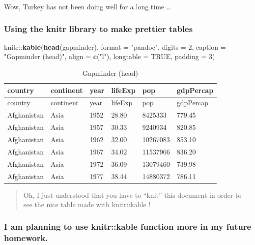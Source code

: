 \documentclass[]{article}
\newenvironment{Shaded}{\begin{snugshade}}{\end{snugshade}}
\newcommand{\KeywordTok}[1]{\textcolor[rgb]{0.13,0.29,0.53}{\textbf{{#1}}}}
\newcommand{\DataTypeTok}[1]{\textcolor[rgb]{0.13,0.29,0.53}{{#1}}}
\newcommand{\DecValTok}[1]{\textcolor[rgb]{0.00,0.00,0.81}{{#1}}}
\newcommand{\StringTok}[1]{\textcolor[rgb]{0.31,0.60,0.02}{{#1}}}
\newcommand{\OtherTok}[1]{\textcolor[rgb]{0.56,0.35,0.01}{{#1}}}
\newcommand{\NormalTok}[1]{{#1}}
\begin{document}
Wow, Turkey has not been doing well for a long time \ldots{}

\subsubsection{Using the knitr library to make prettier
tables}\label{using-the-knitr-library-to-make-prettier-tables}

\begin{Shaded}
\begin{Highlighting}[]
\NormalTok{knitr::}\KeywordTok{kable}\NormalTok{(}\KeywordTok{head}\NormalTok{(gapminder), }
             \DataTypeTok{format =} \StringTok{"pandoc"}\NormalTok{, }
             \DataTypeTok{digits =} \DecValTok{2}\NormalTok{,}
             \DataTypeTok{caption =} \StringTok{"Gapminder (head)"}\NormalTok{,}
             \DataTypeTok{align =} \KeywordTok{c}\NormalTok{(}\StringTok{"l"}\NormalTok{),}
             \DataTypeTok{longtable =} \OtherTok{TRUE}\NormalTok{,}
             \DataTypeTok{padding =} \DecValTok{3}\NormalTok{)}
\end{Highlighting}
\end{Shaded}

\begin{longtable}[]{@{}llllll@{}}
\caption{Gapminder (head)}\tabularnewline
\toprule
country & continent & year & lifeExp & pop & gdpPercap\tabularnewline
\midrule
\endfirsthead
\toprule
country & continent & year & lifeExp & pop & gdpPercap\tabularnewline
\midrule
\endhead
Afghanistan & Asia & 1952 & 28.80 & 8425333 & 779.45\tabularnewline
Afghanistan & Asia & 1957 & 30.33 & 9240934 & 820.85\tabularnewline
Afghanistan & Asia & 1962 & 32.00 & 10267083 & 853.10\tabularnewline
Afghanistan & Asia & 1967 & 34.02 & 11537966 & 836.20\tabularnewline
Afghanistan & Asia & 1972 & 36.09 & 13079460 & 739.98\tabularnewline
Afghanistan & Asia & 1977 & 38.44 & 14880372 & 786.11\tabularnewline
\bottomrule
\end{longtable}

\begin{quote}
Oh, I just understood that you have to ``knit'' this document in order
to see the nice table made with knitr::kable !
\end{quote}

\subsubsection{I am planning to use knitr::kable function more in my
future
homework.}\label{i-am-planning-to-use-knitrkable-function-more-in-my-future-homework.}
\end{document}
